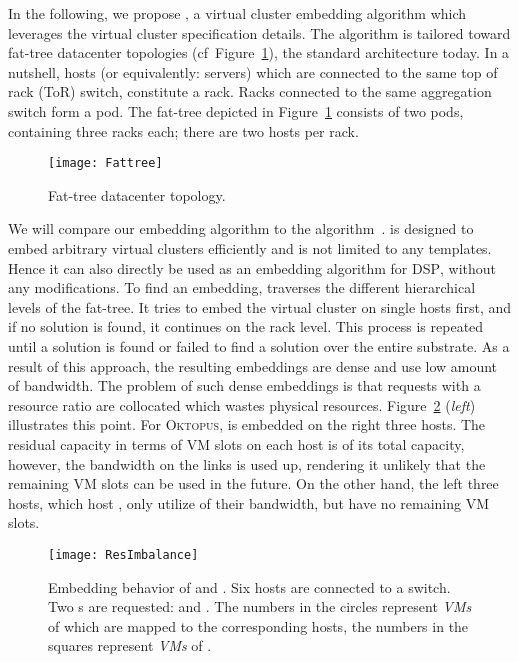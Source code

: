 \documentclass{sig-alternate-per}
\newcommand{\OKTO}{\textsc{Oktopus}}
\newcommand{\pricing}{\textsc{DSP}}
\begin{document}
In the following, we propose , a virtual cluster embedding algorithm which leverages the virtual cluster
specification details.
 The algorithm is tailored toward fat-tree datacenter topologies (cf~Figure~\ref{fig:fattree-pic}),
 the standard architecture today.
In a nutshell, hosts (or equivalently: servers) which are connected to the same top of rack (ToR) switch, constitute a
rack.
Racks connected to the same aggregation switch form a pod. The fat-tree depicted in Figure~\ref{fig:fattree-pic}
consists of two pods,
containing three racks each; there are two hosts per rack.

\begin{figure}[t]
  \centering
\texttt{[image: Fattree]}
      \caption{Fat-tree datacenter topology.}
      \label{fig:fattree-pic}
  \end{figure}

We will compare our embedding algorithm  to the  algorithm~\cite{short-ballani2011towards}.  is designed to embed arbitrary virtual clusters efficiently and is
not limited
to any templates. Hence it can also directly be used as an embedding algorithm for \pricing, without any modifications.
To find an embedding,  traverses the different hierarchical levels of the fat-tree. It tries to
embed
the virtual cluster on single hosts first, and if no solution is found, it continues on the rack level. This process is
repeated until a
solution is found or  failed to find a solution over the entire substrate. As a result of this approach, the
resulting embeddings are dense and use low amount of bandwidth.
The problem of such dense embeddings is that requests with a resource ratio  are collocated which wastes
physical resources. Figure~\ref{fig:imbalance-pic} (\emph{left}) illustrates this point.
For \OKTO,  is embedded on the right three hosts. The residual capacity in terms of VM slots on each host is  of its total capacity,
however, the bandwidth on the links is used up, rendering it unlikely that the remaining VM slots
can be used in the future. On the other hand, the left three hosts, which host , only utilize  of their bandwidth, but have
no remaining VM
slots.

\begin{figure}[ht]
  \centering
\texttt{[image: ResImbalance]}
      \caption{Embedding behavior of  and . Six hosts are connected to a switch. Two s are requested:  and . The numbers in the
circles represent \emph{VMs} of  which are mapped to the corresponding hosts, the numbers in the squares represent
\emph{VMs} of .}
      \label{fig:imbalance-pic}
  \end{figure}
\end{document}
